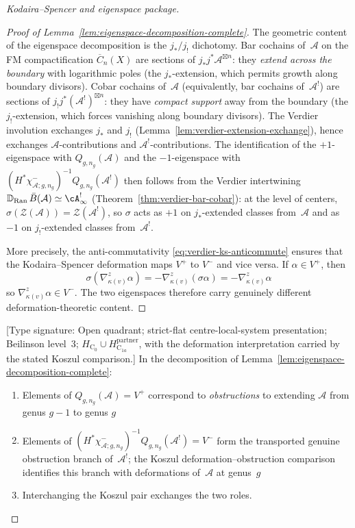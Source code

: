 \begin{proof}[Kodaira--Spencer and eigenspace package]
\begin{proof}[Proof of Lemma~\ref{lem:eigenspace-decomposition-complete}]
The geometric content of the eigenspace decomposition
is the $j_*/j_!$ dichotomy.
Bar cochains of~$\mathcal{A}$ on the FM compactification
$\overline{C}_n(X)$ are sections of
$j_*j^*\mathcal{A}^{\boxtimes n}$: they \emph{extend across the
boundary} with logarithmic poles (the $j_*$-extension, which
permits growth along boundary divisors).
Cobar cochains of~$\mathcal{A}$ (equivalently, bar cochains
of~$\mathcal{A}^!$) are sections of
$j_!j^*(\mathcal{A}^!)^{\boxtimes n}$: they have \emph{compact
support} away from the boundary (the $j_!$-extension, which
forces vanishing along boundary divisors).
The Verdier involution exchanges $j_*$ and $j_!$
(Lemma~\ref{lem:verdier-extension-exchange}), hence exchanges
$\mathcal{A}$-contributions and $\mathcal{A}^!$-contributions.
The identification of the $+1$-eigenspace with
$Q_{g,n_g}(\mathcal{A})$ and the $-1$-eigenspace with
$(H^*\chi^-_{\mathcal A;g,n_g})^{-1}Q_{g,n_g}(\mathcal{A}^!)$
then follows from the Verdier intertwining
$\mathbb{D}_{\mathrm{Ran}}\, \bar{B}(\mathcal{A}) \simeq
\cA^!_\infty$ (Theorem~\ref{thm:verdier-bar-cobar}):
at the level of centers,
$\sigma(\mathcal{Z}(\mathcal{A})) = \mathcal{Z}(\mathcal{A}^!)$,
so $\sigma$ acts as $+1$ on $j_*$-extended classes from~$\mathcal{A}$
and as $-1$ on $j_!$-extended classes from~$\mathcal{A}^!$.

More precisely, the anti-commutativity
\eqref{eq:verdier-ks-anticommute} ensures that the Kodaira--Spencer
deformation maps $V^+$ to $V^-$ and vice versa. If $\alpha \in V^+$,
then
\begin{equation}
\sigma(\nabla_{\kappa(v)}^z \alpha) = -\nabla_{\kappa(v)}^z (\sigma \alpha) =
-\nabla_{\kappa(v)}^z \alpha
\end{equation}
so $\nabla_{\kappa(v)}^z \alpha \in V^-$. The two eigenspaces therefore
carry genuinely different deformation-theoretic content.
\end{proof}

\begin{lemma}
\label{lem:obs-def-split-complete}
\textup{[Type signature: Open quadrant; strict-flat
centre-local-system presentation; Beilinson level~3;
\(H_{\mathrm C_0}\cup H_{\mathrm C_{1a}}^{\mathrm{partner}}\),
with the deformation interpretation carried by the stated Koszul
comparison.]}
In the decomposition of Lemma~\ref{lem:eigenspace-decomposition-complete}:
\begin{enumerate}
\item Elements of $Q_{g,n_g}(\mathcal{A}) = V^+$ correspond to \emph{obstructions}
to extending $\mathcal{A}$ from genus $g-1$ to genus $g$
\item Elements of
$(H^*\chi^-_{\mathcal A;g,n_g})^{-1}Q_{g,n_g}(\mathcal{A}^!)=V^-$
form the transported genuine obstruction branch of~$\mathcal A^!$;
the Koszul deformation--obstruction comparison identifies this branch
with deformations of~$\mathcal A$ at genus~$g$
\item Interchanging the Koszul pair exchanges the two roles.
\end{enumerate}
\end{lemma}


\end{proof}
